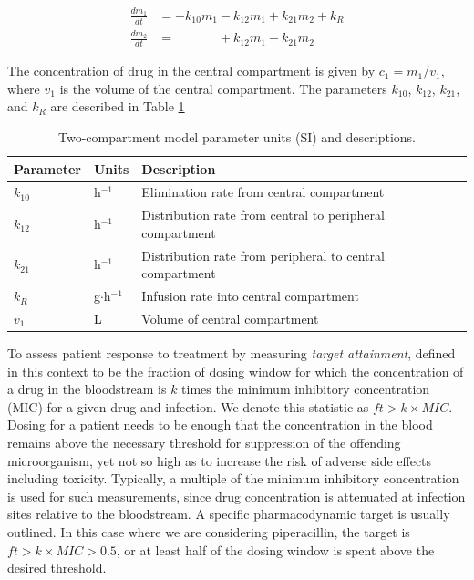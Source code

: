 \documentclass{article}\usepackage[]{graphicx}\usepackage[]{color}
\newcommand{\mic}{$ft > k \times MIC$}
\begin{document}
\begin{align}
\frac{dm_1}{dt} &= -k_{10}m_1 - k_{12}m_1 + k_{21}m_2 + k_R \nonumber \\
\frac{dm_2}{dt} &= \phantom{-k_{10}m_1} + k_{12}m_1 - k_{21}m_2 \nonumber
\end{align}

The concentration of drug in the central compartment is given by $c_1 = m_1/v_1$, where $v_1$ is the volume of the central compartment. The parameters $k_{10}$, $k_{12}$, $k_{21}$, and $k_R$ are described in Table \ref{tab:pkpars}

\begin{table}
\begin{tabular}{lll} \hline
Parameter & Units & Description \\ \hline
$k_{10}$ & h$^{-1}$ & Elimination rate from central compartment\\
$k_{12}$ & h$^{-1}$ & Distribution rate from central to peripheral compartment\\
$k_{21}$ & h$^{-1}$ & Distribution rate from peripheral to central compartment\\
$k_R$  & g$\cdot$h$^{-1}$ & Infusion rate into central compartment\\
$v_1$  & L & Volume of central compartment\\
\hline
\end{tabular}
\caption{Two-compartment model parameter units (SI) and descriptions. \label{tab:pkpars}}
\end{table}

To assess patient response to treatment by measuring {\it target attainment}, defined in this context to be the fraction of dosing window for which the concentration of a drug in the bloodstream is $k$ times the minimum inhibitory concentration (MIC) for a given drug and infection. We denote this statistic as \mic. Dosing for a patient needs to be enough that the concentration in the blood remains above the necessary threshold for suppression of the offending microorganism, yet not so high as to increase the risk of adverse side effects including toxicity. Typically, a multiple of the minimum inhibitory concentration is used for such measurements, since drug concentration is attenuated at infection sites relative to the bloodstream. A specific pharmacodynamic target is usually outlined. In this case where we are considering piperacillin, the target is \mic $> 0.5$, or at least half of the dosing window is spent above the desired threshold. \\
\end{document}
